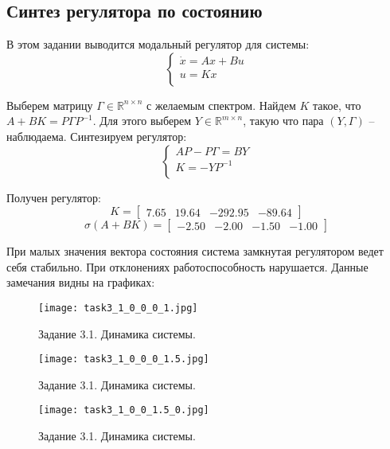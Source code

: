 \subsection{Синтез регулятора по состоянию}
В этом задании выводится модальный регулятор для системы:
\begin{equation}
    \begin{cases}
        \dot{x} = A x + Bu \\
        u = K x \\
\end{cases} 
\end{equation}

Выберем матрицу $\Gamma \in \mathbb{R}^{n \times n}$ с желаемым спектром. Найдем $K$ такое, что $A+BK = P \Gamma P^{-1}$.
Для этого выберем $Y \in \mathbb{R}^{m \times n}$, такую что пара $(Y, \Gamma)$ -- наблюдаема. Синтезируем регулятор:
\begin{equation}
        \begin{cases}
                AP - P\Gamma = BY \\
                K = -YP^{-1} \\
        \end{cases}
\end{equation}



Получен регулятор:
\[K = \begin{bmatrix}
    7.65 &  19.64 & -292.95 & -89.64
  \end{bmatrix}\]
\[\sigma(A + B K) = \begin{bmatrix}
    -2.50 & -2.00 & -1.50 & -1.00
\end{bmatrix}\]

При малых значения вектора состояния система замкнутая регулятором ведет себя стабильно. При отклонениях работоспособность нарушается. Данные замечания видны на графиках:

\begin{figure}[]
  \centering
  \texttt{[image: task3\_1\_0\_0\_0\_1.jpg]}
  \caption{Задание 3.1. Динамика системы.}
  \label{fig:task3_1_0_0_0_1.jpg}
\end{figure}
\begin{figure}[]
    \centering
    \texttt{[image: task3\_1\_0\_0\_0\_1.5.jpg]}
    \caption{Задание 3.1. Динамика системы.}
    \label{fig:task3_1_0_0_0_1.5.jpg}
  \end{figure}
  \begin{figure}[]
    \centering
    \texttt{[image: task3\_1\_0\_0\_1.5\_0.jpg]}
    \caption{Задание 3.1. Динамика системы.}
    \label{fig:task3_1_0_0_0_1.5.jpg}
  \end{figure}

